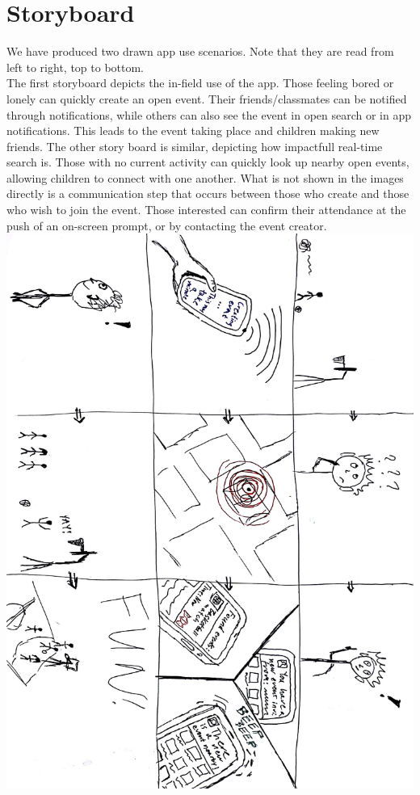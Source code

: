 \documentclass[12pt]{report}
\begin{document}
	\section*{\huge Storyboard}
	We have produced two drawn app use scenarios. Note that they are read from left to right, top to bottom.\\
	The first storyboard depicts the in-field use of the app. Those feeling bored or lonely can quickly create an open event. Their friends/classmates can be notified through notifications, while others can also see the event in open search or in app notifications. This leads to the event taking place and children making new friends. The other story board is similar, depicting how impactfull real-time search is. Those with no current activity can quickly look up nearby open events, allowing children to connect with one another. What is not shown in the images directly is a communication step that occurs between those who create and those who wish to join the event. Those interested can confirm their attendance at the push of an on-screen prompt, or by contacting the event creator.
	\newpage
	\includegraphics[width=\linewidth]{Story1.jpg}\break	
\end{document}

